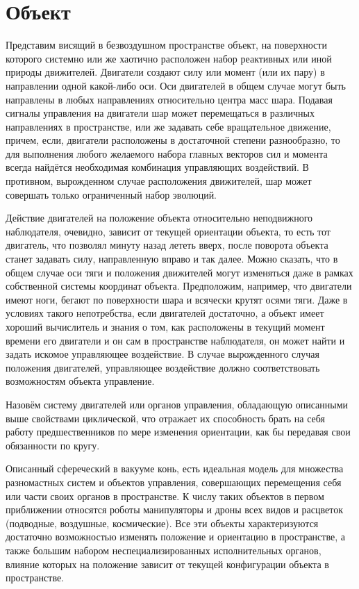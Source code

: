 \documentclass[a4paper]{article}
\begin{document}
\section{Объект}
Представим висящий в безвоздушном пространстве объект, на поверхности которого системно или же хаотично расположен набор реактивных или иной природы движителей. Двигатели создают силу или момент (или их пару) в направлении одной какой-либо оси. Оси двигателей в общем случае могут быть направлены в любых направлениях относительно центра масс шара. Подавая сигналы управления на двигатели шар может перемещаться в различных направлениях в пространстве, или же задавать себе вращательное движение, причем, если, двигатели расположены в достаточной степени разнообразно, то для выполнения любого желаемого набора главных векторов сил и момента всегда найдётся необходимая комбинация управляющих воздействий. В противном, вырожденном случае расположения движителей, шар может совершать только ограниченный набор эволюций.

Действие двигателей на положение объекта относительно неподвижного наблюдателя, очевидно, зависит от текущей ориентации объекта, то есть тот двигатель, что позволял минуту назад лететь вверх, после поворота объекта станет задавать силу, направленную вправо и так далее. Можно сказать, что в общем случае оси тяги и положения движителей могут изменяться даже в рамках собственной системы координат объекта. Предположим, например, что двигатели имеют ноги, бегают по поверхности шара и всячески крутят осями тяги. Даже в условиях такого непотребства, если двигателей достаточно, а объект имеет хороший вычислитель и знания о том, как расположены в текущий момент времени его двигатели и он сам в пространстве наблюдателя, он может найти и задать искомое управляющее воздействие. В случае вырожденного случая положения двигателей, управляющее воздействие должно соответствовать возможностям объекта управление. 

Назовём систему двигателей или органов управления, обладающую описанными выше свойствами циклической, что отражает их способность брать на себя работу предшественников по мере изменения ориентации, как бы передавая свои обязанности по кругу.

Описанный сфереческий в вакууме конь, есть идеальная модель для множества разномастных систем и объектов управления, совершающих перемещения себя или части своих органов в пространстве. К числу таких объектов в первом приближении относятся роботы манипуляторы и дроны всех видов и расцветок (подводные, воздушные, космические). Все эти объекты характеризуются достаточно возможностью изменять положение и ориентацию в пространстве, а также большим набором неспециализированных исполнительных органов, влияние которых на положение зависит от текущей конфигурации объекта в пространстве.
\end{document}
